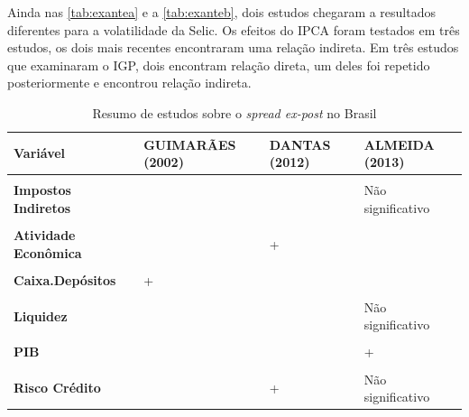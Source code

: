 \documentclass[12pt,12pt,openright,oneside,a4paper,chapter=TITLE,section=TITLE,subsection=TITLE,subsubsection=TITLE,english,french,spanish,portugues,sumario=tradicional]{abntex2}
\begin{document}
Ainda nas \autoref{tab:exantea} e a \autoref{tab:exanteb}, dois estudos chegaram a resultados diferentes para a volatilidade da Selic. Os efeitos do IPCA foram testados em três estudos, os dois mais recentes encontraram uma relação indireta. Em três estudos que examinaram o IGP, dois encontram relação direta, um deles foi repetido posteriormente e encontrou relação indireta.

\begin{table}
\caption{Resumo de estudos sobre o \emph{spread ex-post} no Brasil}
\begingroup\fontsize{10}{12}\selectfont

\begin{tabu} to 
\toprule
Variável & GUIMARÃES (2002) & DANTAS (2012) & ALMEIDA (2013)\\
\midrule
\textbf{} &  &  & \\
\textbf{Impostos Indiretos} &  &  & Não significativo\\
\textbf{} &  &  & \\
\textbf{Atividade Econômica} &  & + & \\
\textbf{} &  &  & \\
\addlinespace
\textbf{Caixa.Depósitos} & + &  & \\
\textbf{} &  &  & \\
\textbf{Liquidez} &  &  & Não significativo\\
\textbf{} &  &  & \\
\textbf{PIB} &  &  & +\\
\addlinespace
\textbf{} &  &  & \\
\textbf{Risco Crédito} &  & + & Não significativo\\
\bottomrule
\end{tabu}
\endgroup{}
\label{tab:expost}
\end{table}
\end{document}

